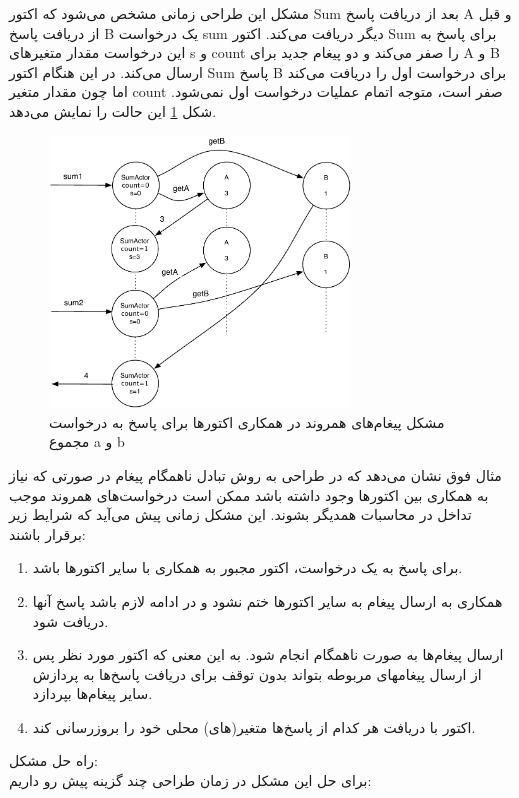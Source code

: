 مشکل این طراحی زمانی مشخص می‌شود که اکتور Sum بعد از دریافت پاسخ‌ A و قبل از دریافت پاسخ B یک درخواست sum دیگر دریافت می‌کند. اکتور Sum برای پاسخ به این درخواست مقدار متغیرهای s و count را صفر می‌کند و دو پیغام جدید برای A و B ارسال می‌کند. در این هنگام اکتور Sum پاسخ B برای درخواست اول را دریافت می‌کند اما چون مقدار متغیر count صفر است، متوجه اتمام عملیات درخواست اول نمی‌شود. شکل \ref{fig:coord2} این حالت را نمایش می‌دهد.
\begin{figure}[h]
    \begin{center}
	\includegraphics[width=8cm]{4-ProposedFramework/Figures/ExampleCoord2.pdf}
    \end{center}
    \caption{\label{fig:coord2} مشکل پیغام‌های همروند در همکاری اکتورها برای پاسخ به درخواست مجموع a و b}
\end{figure}
مثال فوق نشان می‌دهد که در طراحی به روش تبادل ناهمگام پیغام در صورتی که نیاز به همکاری بین اکتورها وجود داشته باشد ممکن است درخواست‌های همروند موجب تداخل در محاسبات همدیگر بشوند. این مشکل زمانی پیش می‌آید که شرایط زیر برقرار باشند:\\
 \begin{enumerate}
 \item برای پاسخ به یک درخواست، اکتور مجبور به همکاری با سایر اکتورها باشد.
 \item همکاری به ارسال پیغام به سایر اکتورها ختم نشود و در ادامه لازم باشد پاسخ آنها دریافت شود. 
 \item ارسال پیغام‌ها به صورت ناهمگام انجام شود. به این معنی که اکتور مورد نظر پس از ارسال پیغامهای مربوطه بتواند بدون توقف برای دریافت پاسخ‌ها به پردازش سایر پیغام‌ها بپردازد.
 \item اکتور با دریافت هر کدام از پاسخ‌ها متغیر(های) محلی خود را بروزرسانی کند.
 \end{enumerate}
راه حل مشکل:\\
برای حل این مشکل در زمان طراحی چند گزینه پیش رو داریم:
